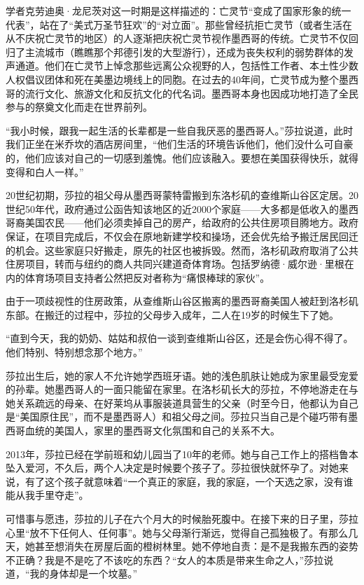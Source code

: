 \documentclass[12pt,oneside]{book}
\begin{document}
\begin{bookref}[frametitle={\cite{好好告别}}]
学者克劳迪奥·龙尼茨对这一时期是这样描述的：亡灵节“变成了国家形象的统一代表”，站在了“美式万圣节狂欢”的“对立面”。那些曾经抗拒亡灵节（或者生活在从不庆祝亡灵节的地区）的人逐渐把庆祝亡灵节视作墨西哥的传统。亡灵节不仅回归了主流城市（瞧瞧那个邦德引发的大型游行），还成为丧失权利的弱势群体的发声通道。他们在亡灵节上悼念那些远离公众视野的人，包括性工作者、本土性少数人权倡议团体和死在美墨边境线上的同胞。在过去的40年间，亡灵节成为整个墨西哥的流行文化、旅游文化和反抗文化的代名词。墨西哥本身也因成功地打造了全民参与的祭奠文化而走在世界前列。

“我小时候，跟我一起生活的长辈都是一些自我厌恶的墨西哥人。”莎拉说道，此时我们正坐在米乔坎的酒店房间里，“他们生活的环境告诉他们，他们没什么可自豪的，他们应该对自己的一切感到羞愧。他们应该融入。要想在美国获得快乐，就得变得和白人一样。”

20世纪初期，莎拉的祖父母从墨西哥蒙特雷搬到东洛杉矶的查维斯山谷区定居。20世纪50年代，政府通过公函告知该地区的近2000个家庭——大多都是低收入的墨西哥裔美国农民——他们必须卖掉自己的房产，给政府的公共住房项目腾地方。政府保证，在项目完成后，不仅会在原地新建学校和操场，还会优先给予搬迁居民回迁的机会。这些家庭只好搬走，原先的社区也被拆毁。然而，洛杉矶政府取消了公共住房项目，转而与纽约的商人共同兴建道奇体育场。包括罗纳德·威尔逊·里根在内的体育场项目支持者公然把反对者称为“痛恨棒球的家伙”。

由于一项歧视性的住房政策，从查维斯山谷区搬离的墨西哥裔美国人被赶到洛杉矶东部。在搬迁的过程中，莎拉的父母步入成年，二人在19岁的时候生下了她。

“直到今天，我的奶奶、姑姑和叔伯一谈到查维斯山谷区，还是会伤心得不得了。他们特别、特别想念那个地方。”

莎拉出生后，她的家人不允许她学西班牙语。她的浅色肌肤让她成为家里最受宠爱的孙辈。她墨西哥人的一面只能留在家里。在洛杉矶长大的莎拉，不停地游走在与她关系疏远的母亲、在好莱坞从事服装道具营生的父亲（时至今日，他都认为自己是“美国原住民”，而不是墨西哥人）和祖父母之间。莎拉只当自己是个碰巧带有墨西哥血统的美国人，家里的墨西哥文化氛围和自己的关系不大。

2013年，莎拉已经在学前班和幼儿园当了10年的老师。她与自己工作上的搭档鲁本坠入爱河，不久后，两个人决定是时候要个孩子了。莎拉很快就怀孕了。对她来说，有了这个孩子就意味着“一个真正的家庭，我的家庭，一个天选之家，没有谁能从我手里夺走”。

可惜事与愿违，莎拉的儿子在六个月大的时候胎死腹中。在接下来的日子里，莎拉心里“放不下任何人、任何事”。她与父母渐行渐远，觉得自己孤独极了。有那么几天，她甚至想消失在房屋后面的橙树林里。她不停地自责：是不是我搬东西的姿势不正确？我是不是吃了不该吃的东西？“女人的本质是带来生命之人，”莎拉说道，“我的身体却是一个坟墓。”


\end{bookref}
\end{document}
